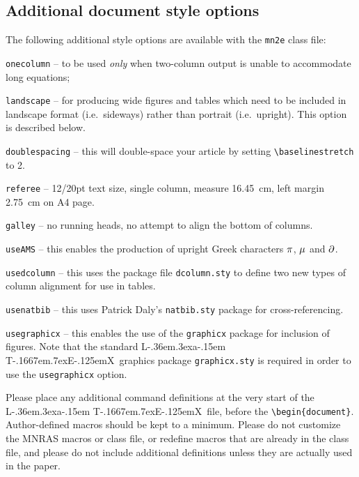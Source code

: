\documentclass[useAMS,usenatbib]{mn2e}
\def\LaTeX{L\kern-.36em\raise.3ex\hbox{a}\kern-.15em
    T\kern-.1667em\lower.7ex\hbox{E}\kern-.125emX}
\begin{document}
\subsection{Additional document style options}

The following additional style options are available with the {\tt mn2e}
class file:
\begin{description}
  \item {\tt onecolumn} -- to be used {\it only} when two-column output
        is unable to accommodate long equations;
  \item {\tt landscape} -- for producing wide figures and tables which
        need to be included in landscape format (i.e.\ sideways) rather
        than portrait (i.e.\ upright). This option is described below.
  \item {\tt doublespacing} -- this will double-space your
        article by setting \verb"\baselinestretch" to 2.
  \item {\tt referee} -- 12/20pt text size, single column,
        measure 16.45~cm, left margin 2.75~cm on A4 page.
  \item {\tt galley} -- no running heads, no attempt to align
        the bottom of columns.
  \item \verb"useAMS" -- this enables the production of upright Greek
characters $\pi$, $\mu$ and $\partial$.

    \item \verb"usedcolumn" -- this uses the package file \verb"dcolumn.sty"
to define two new types of column alignment for use in tables.

    \item \verb"usenatbib" -- this uses Patrick Daly's \verb"natbib.sty"
package for cross-referencing.

 \item \verb"usegraphicx" -- this enables the use of the {\tt graphicx}
 package for inclusion of figures. Note that the standard \LaTeX\
 graphics package \verb"graphicx.sty" is
 required in order to use the \verb"usegraphicx" option.
\end{description}

Please place any additional command definitions at the very start
of the \LaTeX\ file, before the \verb"\begin{document}".
Author-defined macros should be kept to a minimum. Please do not
customize the MNRAS macros or class file, or redefine macros that
are already in the class file, and please do not include
additional definitions unless they are actually used in the paper.
\end{document}
